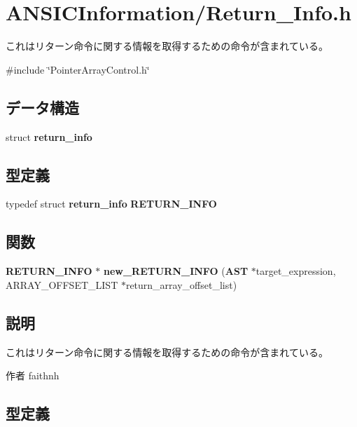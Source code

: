 \section{ANSICInformation/Return\_\-Info.h}
\label{Return__Info_8h}


これはリターン命令に関する情報を取得するための命令が含まれている。  


{\ttfamily \#include \char`\"{}PointerArrayControl.h\char`\"{}}\par
\subsection*{データ構造}
\begin{DoxyCompactItemize}
\item 
struct {\bf return\_\-info}
\end{DoxyCompactItemize}
\subsection*{型定義}
\begin{DoxyCompactItemize}
\item 
typedef struct {\bf return\_\-info} {\bf RETURN\_\-INFO}
\end{DoxyCompactItemize}
\subsection*{関数}
\begin{DoxyCompactItemize}
\item 
{\bf RETURN\_\-INFO} $\ast$ {\bf new\_\-RETURN\_\-INFO} ({\bf AST} $\ast$target\_\-expression, ARRAY\_\-OFFSET\_\-LIST $\ast$return\_\-array\_\-offset\_\-list)
\end{DoxyCompactItemize}


\subsection{説明}
これはリターン命令に関する情報を取得するための命令が含まれている。 \begin{DoxyAuthor}{作者}
faithnh 
\end{DoxyAuthor}


\subsection{型定義}

